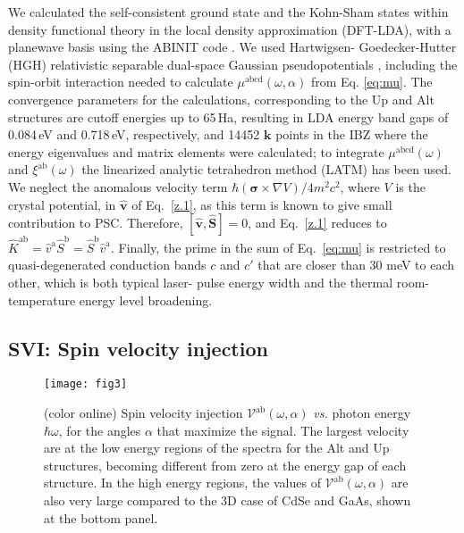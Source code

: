 \documentclass[floatfix,prb,aps,superscriptaddress,showpacs,11pt,preprint,letterpaper]{revtex4}
\def\tama{10cm}
\begin{document}
We calculated the self-consistent ground state and the Kohn-Sham states within
density functional theory in the local density approximation (DFT-LDA), with a
planewave basis using the ABINIT code \cite{gonzeCPC09}. We used Hartwigsen-
Goedecker-Hutter (HGH) relativistic separable dual-space Gaussian
pseudopotentials \cite{hartwigsenPRB98}, including the spin-orbit interaction
needed to calculate $\mu^{\mathrm{abcd}}(\omega,\alpha)$ from Eq.
\eqref{eq:mu}.
The convergence parameters for the calculations,  corresponding to the Up and
Alt structures are cutoff energies up to 65\,Ha, resulting in LDA
energy band gaps of 0.084\,eV and 0.718\,eV, respectively, 
and 14452 ${\mathbf k}$ points in the IBZ
where the energy
eigenvalues and matrix elements were calculated;
to
integrate $\mu^{\mathrm{abcd}}(\omega)$ and
$\xi^{\mathrm{a}\mathrm{b}}(\omega)$ the linearized analytic tetrahedron method
(LATM) has been used.\cite{nastosPRB07} 
We neglect the anomalous velocity term
$\hbar(\boldsymbol{\sigma}\times\nabla V)/4m^2c^2$, where $V$ is the crystal
potential, in $\hat{\mathbf v}$ of Eq.~\eqref{z.1}, as this term is known to
give small contribution to PSC.\cite{bhatPRL05} Therefore, $[\hat{\mathbf
v},\hat{\mathbf S}]=0$, and Eq.~\eqref{z.1} reduces to $\hat
K^{\mathrm{a}\mathrm{b}}=\hat v^\mathrm{a} \hat S^\mathrm{b}=\hat S^\mathrm{b}
\hat v^\mathrm{a}$. Finally, the prime in the sum of Eq.~\eqref{eq:mu} is
restricted to quasi-degenerated conduction bands $c$ and $c'$ that are closer
than 30 meV to each other, which  is both typical laser- pulse energy width and the thermal
room-temperature energy level broadening.\cite{nastosPRB07}

\subsection{SVI: Spin velocity injection}
\label{sec:res-spin_velocity}

\begin{figure}[t]
\centering
\texttt{[image: fig3]}
\caption{(color online)  Spin velocity injection
  $\mathcal{V}^{\mathrm{ab}}(\omega,\alpha)$ {\it vs.} photon energy
  $\hbar\omega$, for the angles $\alpha$ that maximize the signal. The largest
  velocity are at the low energy regions of the spectra for the Alt and Up
  structures, becoming different from zero at the energy gap of each structure.
  In the high energy regions, the values of
  $\mathcal{V}^{\mathrm{ab}}(\omega,\alpha)$ are also very large compared to
  the 3D case of CdSe and GaAs, shown at the bottom panel.}
\label{fig:vab-str-comp}
\end{figure}
\end{document}
